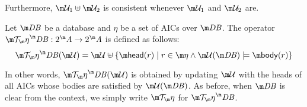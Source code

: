 % 
% 
Furthermore, $\UU_1\uplus\UU_2$ is consistent whenever $\UU_1$ and $\UU_2$ are.
%
\begin{definition}
  Let $\db$ be a database and $\eta$ be a set of AICs over $\db$.
  The operator $\Op^\db:2^\acts\to 2^\acts$ is defined as follows:
  \[
    \Op^\db(\UU) = \UU\uplus\{\head(r)\mid r\in \aics \land \UU(\db)\models\body(r)\}
  \]
\end{definition}
In other words, $\Op^\db(\UU)$ is obtained by updating $\UU$ with the heads of all AICs whose bodies are satisfied by $\UU(\db)$.
As before, when $\db$ is clear from the context, we simply write $\Op$ for $\Op^\db$.

